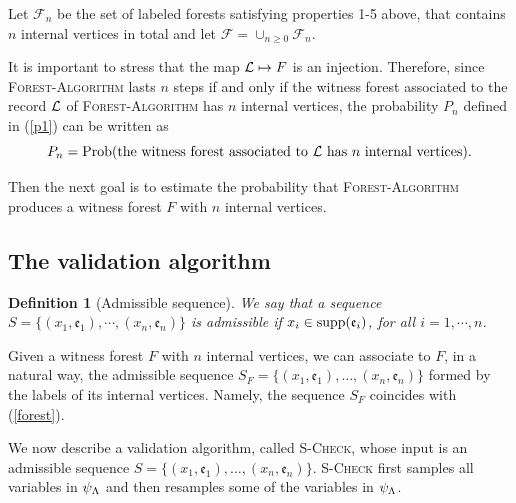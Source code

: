 \documentclass[11pt]{article}
\newtheorem{defi}[theo]{Definition}
\let\\=\noindent
\let\\=\noindent
\def\obj{{\rm supp}}
\def\prob{{\rm Prob}}
\def\ev{{\mathfrak{e}}}
\begin{document}
\\Let  $\mathcal{F}_n$ be the set of labeled  forests satisfying properties 1-5 above, that contains  $n$ internal vertices in total and let
$\mathcal{F}=\cup_{n\ge 0} \mathcal{F}_n$.

\\It is important to stress that the map ${\cal L}\mapsto F$ is an injection. Therefore, since \textsc{Forest-Algorithm} lasts $n$ steps if and only if the witness forest associated to the record $\cal L$ of \textsc{Forest-Algorithm} has $n$ internal vertices, the probability $P_n$ defined in (\ref{p1}) can be written as
\begin{equation}\label{wf}
P_n    = \prob(\mbox{the witness forest associated to $\cal L$ has} \ n \ \mbox{internal vertices}).
\end{equation}

\\Then the next goal is to estimate the probability that \textsc{Forest-Algorithm} produces a witness forest $F$ with $n$ internal vertices.

\subsection{The validation algorithm}\label{ssc}

\begin{defi}[Admissible sequence]
We say that a sequence $S=\{(x_1,\ev_1), \cdots, (x_n, \ev_n)\}$ is admissible if $x_i \in \obj(\ev_i)$, for all $i=1, \cdots, n$.
\end{defi}

\\Given a witness forest $F$ with $n$ internal vertices, we can associate to $F$, in a natural way, the  admissible sequence $S_F=\{(x_1,\ev_1), \dots, (x_n,\ev_{n})\}$  formed by the labels of its internal vertices. Namely, the sequence $S_F$ coincides with (\ref{forest}).

\\We now describe a validation algorithm,  called \textsc{S-Check}, whose input is an admissible sequence $S=\{(x_1,\ev_1), \dots, (x_n,\ev_{n})\}$. \textsc{S-Check} first samples all variables in $\psi_\Lambda$ and then resamples some of the variables in $\psi_\Lambda$.
\end{document}
